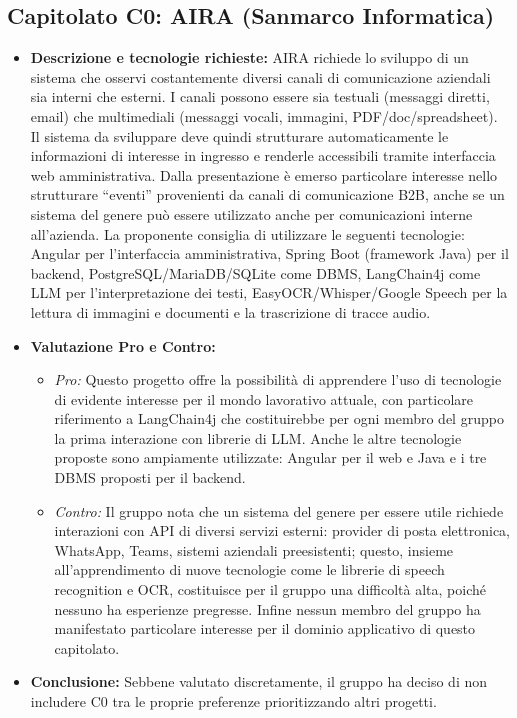 \documentclass[12pt,a4paper]{article}
\newcommand{\tightlist}{\setlength{\itemsep}{1pt}\setlength{\parskip}{0pt}}
\begin{document}
\hypertarget{capitolato-c0}{%
\subsection{Capitolato C0: AIRA (Sanmarco Informatica)}}
\begin{itemize}
\tightlist
\item \textbf{Descrizione e tecnologie richieste:} AIRA richiede lo sviluppo di un sistema che osservi costantemente diversi canali di comunicazione aziendali sia interni che esterni. I canali possono essere sia testuali (messaggi diretti, email) che multimediali (messaggi vocali, immagini, PDF/doc/spreadsheet). Il sistema da sviluppare deve quindi strutturare automaticamente le informazioni di interesse in ingresso e renderle accessibili tramite interfaccia web amministrativa. Dalla presentazione è emerso particolare interesse nello strutturare “eventi” provenienti da canali di comunicazione B2B, anche se un sistema del genere può essere utilizzato anche per comunicazioni interne all’azienda.
La proponente consiglia di utilizzare le seguenti tecnologie:
Angular per l’interfaccia amministrativa, Spring Boot (framework Java) per il backend, PostgreSQL/MariaDB/SQLite come DBMS, LangChain4j come LLM per l’interpretazione dei testi, EasyOCR/Whisper/Google Speech per la lettura di immagini e documenti e la trascrizione di tracce audio.

\item \textbf{Valutazione Pro e Contro:}
  \begin{itemize}
  \tightlist
  \item \emph{Pro:} Questo progetto offre la possibilità di apprendere l’uso di tecnologie di evidente interesse per il mondo lavorativo attuale, con particolare riferimento a LangChain4j che costituirebbe per ogni membro del gruppo la prima interazione con librerie di LLM. Anche le altre tecnologie proposte sono ampiamente utilizzate: Angular per il web e Java e i tre DBMS proposti per il backend.
  \item \emph{Contro:} Il gruppo nota che un sistema del genere per essere utile richiede interazioni con API di diversi servizi esterni: provider di posta elettronica, WhatsApp, Teams, sistemi aziendali preesistenti; questo, insieme all’apprendimento di nuove tecnologie come le librerie di speech recognition e OCR, costituisce per il gruppo una difficoltà alta, poiché nessuno ha esperienze pregresse.
Infine nessun membro del gruppo ha manifestato particolare interesse per il dominio applicativo di questo capitolato.

  \end{itemize}
\item \textbf{Conclusione:} Sebbene valutato discretamente, il gruppo ha deciso di non includere C0 tra le proprie preferenze prioritizzando altri progetti.
\end{itemize}
\end{document}
